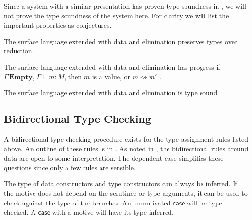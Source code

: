 Since a system with a similar presentation has proven type soundness in \cite{sjoberg2012irrelevance}, we will not prove the type soundness of the system here.
For clarity we will list the important properties as conjectures.
\begin{conjecture}
The surface language extended with data and elimination preserves types over reduction.
\end{conjecture}

\begin{conjecture}
The surface language extended with data and elimination has progress
if $\Gamma\,\mathbf{Empty}$, \textup{$\Gamma\vdash m:M$}, then $m$
is a value, or $m\rightsquigarrow m'$ .
\end{conjecture}

\begin{conjecture}
The surface language extended with data and elimination is type sound.
\end{conjecture}


\subsection{Bidirectional Type Checking}

A bidirectional type checking procedure exists for the type assignment rules listed above.
An outline of these rules is in .
As noted in \cite{10.1145/3450952}, the bidirectional rules around data are open to some interpretation.
The dependent case simplifies these questions since only a few rules are sensible.

The type of data constructors and type constructors can always be inferred.
If the motive does not depend on the scrutinee or type arguments, it can be used to check against the type of the branches.
An unmotivated $\mathsf{case}$ will be type checked.
A $\mathsf{case}$ with a motive will have its type inferred.


